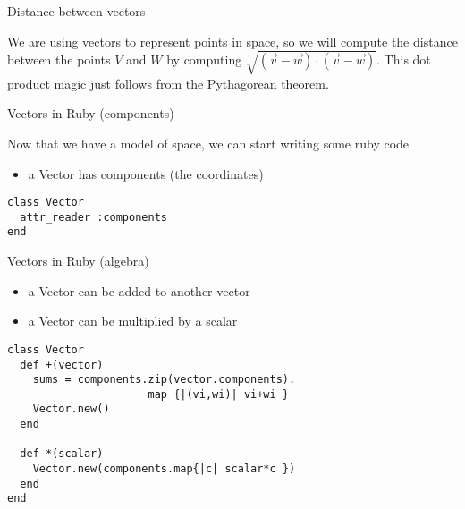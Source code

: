 \documentclass[bigger]{beamer}
\begin{document}
\begin{frame}[label=sec-15]{Distance between vectors}
\begin{block}{We are using vectors to represent points in space, so we will compute the distance between the points $V$ and $W$ by computing $\sqrt{(\vec{v}-\vec{w})\cdot (\vec{v}-\vec{w})}$. \alert{This dot product magic just follows from the Pythagorean theorem}.}
\begin{center}
\end{center}
\end{block}
\end{frame}

\begin{frame}[fragile,label=sec-16]{Vectors in Ruby (components)}
 \begin{block}{Now that we have a \alert{model of space}, we can start writing some ruby code}
\begin{itemize}
\item a Vector has components (the coordinates)
\end{itemize}
\begin{verbatim}
class Vector
  attr_reader :components
end
\end{verbatim}
\end{block}
\end{frame}

\begin{frame}[fragile,label=sec-17]{Vectors in Ruby (algebra)}
 \begin{itemize}
\item a Vector can be added to another vector
\item a Vector can be multiplied by a scalar
\end{itemize}
\begin{verbatim}
class Vector
  def +(vector)
    sums = components.zip(vector.components).
                      map {|(vi,wi)| vi+wi }
    Vector.new()
  end

  def *(scalar)
    Vector.new(components.map{|c| scalar*c })
  end
end
\end{verbatim}
\end{frame}
\end{document}

